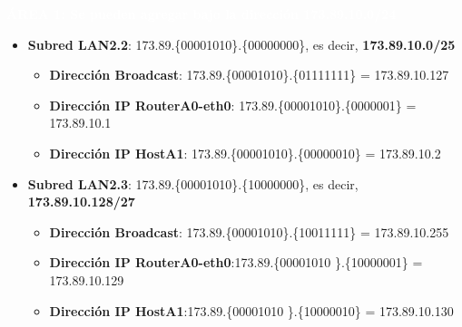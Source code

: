 \par \colorbox{verdeoscuro}{\textbf{\textcolor{white}{ÁREA 1: Se pueden agregar bajo la dirección 173.89.10.0/24}}}
\begin{itemize}
	\item{\textbf{Subred LAN2.2}:} 173.89.\{\textcolor{azul}{000010}\textcolor{rojo}{10}\}.\{\textcolor{rojo}{0}0000000\}, es decir, \textbf{173.89.10.0/25}
		\begin{itemize}
			\item{\textbf{Dirección Broadcast}}: 173.89.\{\textcolor{azul}{000010}\textcolor{rojo}{10}\}.\{\textcolor{rojo}{0}1111111\} = 173.89.10.127
			\item{\textbf{Dirección IP RouterA0-eth0}}: 173.89.\{\textcolor{azul}{000010}\textcolor{rojo}{10}\}.\{\textcolor{rojo}{0}000001\} = 173.89.10.1
			\item{\textbf{Dirección IP HostA1}}: 173.89.\{\textcolor{azul}{000010}\textcolor{rojo}{10}\}.\{\textcolor{rojo}{0}0000010\} = 173.89.10.2
		\end{itemize}
	\item{\textbf{Subred LAN2.3}:} 173.89.\{\textcolor{azul}{000010}\textcolor{rojo}{10}\}.\{\textcolor{rojo}{100}00000\}, es decir, \textbf{173.89.10.128/27}
		\begin{itemize}
			\item{\textbf{Dirección Broadcast}}: 173.89.\{\textcolor{azul}{000010}\textcolor{rojo}{10}\}.\{\textcolor{rojo}{100}11111\} = 173.89.10.255
			\item{\textbf{Dirección IP RouterA0-eth0}}:173.89.\{\textcolor{azul}{000010}\textcolor{rojo}{10} \}.\{\textcolor{rojo}{100}00001\} = 173.89.10.129
			\item{\textbf{Dirección IP HostA1}}:173.89.\{\textcolor{azul}{000010}\textcolor{rojo}{10} \}.\{\textcolor{rojo}{100}00010\} = 173.89.10.130
		\end{itemize}
\end{itemize}

